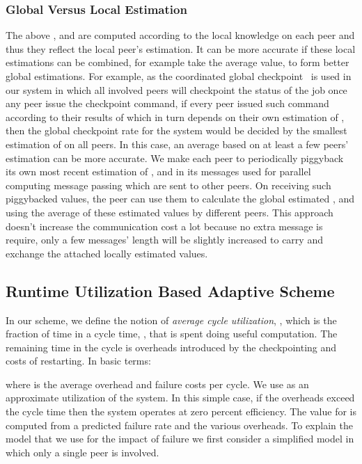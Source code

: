 \documentclass[times, 12pt, onecolumn]{article}
\begin{document}
\subsubsection{Global Versus Local Estimation}
The above ,  and  are computed according to the local knowledge
on each peer and thus they reflect the local peer's estimation. It can be more accurate if these local
estimations can be combined, for example take the average value, to form better global estimations. For example, 
as the coordinated global checkpoint~\cite{ChandyL85} is used in our system in which all involved peers will 
checkpoint the status of the job once any peer issue the checkpoint command, if every peer issued such 
command according to their results of  which in turn depends on their own estimation of , then
the global checkpoint rate for the system would be decided by the smallest estimation of  on all peers. 
In this case, an average  based on at least a few peers' estimation 
can be more accurate. We make each peer to periodically piggyback its own most recent 
estimation of ,  and  in its messages used for parallel computing message passing which are sent 
to other peers. On receiving such piggybacked values, the peer can use them to calculate the global estimated 
,  and  using the average of these estimated values by different peers. This approach doesn't 
increase the communication cost a lot because no extra message is require, only a few messages' length will be 
slightly increased to carry and exchange the attached locally estimated values. 

\subsection{Runtime Utilization Based Adaptive Scheme}
\label{model}
In our scheme, we define the notion of \emph{average cycle utilization}, ,
which is the fraction of time in a cycle time, , that is spent doing
useful computation. The remaining time in the cycle is overheads introduced by
the checkpointing and costs of restarting.  In basic terms:

where  is the average overhead and failure costs per cycle. We use  as an
approximate utilization of the system. In this simple case, if the overheads
exceed the cycle time then the system operates at zero percent efficiency. The
value for  is computed from a predicted failure rate and the various
overheads.  To explain the model that we use for the impact of failure we first
consider a simplified model in which only a single peer is involved. 
\end{document}
